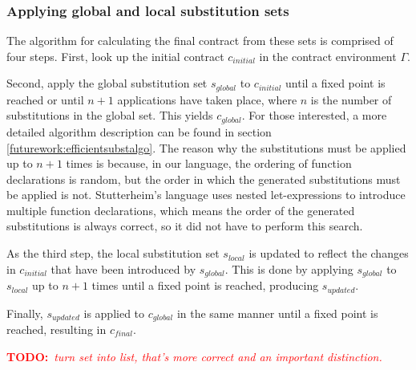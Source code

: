 \documentclass[10pt]{report}
\newcommand{\annotate}[3]{
	\begin{scriptsize}
	\textcolor{#1}{\textbf{#2}~\textit{#3}}
	\end{scriptsize}\newline}
\newcommand{\todo}[1]{\annotate{red} {TODO:} {#1}}
\begin{document}
\subsubsection{Applying global and local substitution sets}

The algorithm for calculating the final contract from these sets is comprised of four steps.
First, look up the initial contract $c_{initial}$ in the contract environment $\Gamma$.

Second, apply the global substitution set $s_{global}$ to $c_{initial}$ until a fixed point is reached or until $n+1$ applications have taken place, where $n$ is the number of substitutions in the global set. 
This yields $c_{global}$.
For those interested, a more detailed algorithm description can be found in section \ref{futurework:efficientsubstalgo}.
The reason why the substitutions must be applied up to $n+1$ times is because, in our language, the ordering of function declarations is random, but the order in which the generated substitutions must be applied is not.
Stutterheim's language uses nested let-expressions to introduce multiple function declarations, which means the order of the generated substitutions is always correct, so it did not have to perform this search.

As the third step, the local substitution set $s_{local}$ is updated to reflect the changes in $c_{initial}$ that have been introduced by $s_{global}$.
This is done by applying $s_{global}$ to $s_{local}$ up to $n+1$ times until a fixed point is reached, producing $s_{updated}$.

Finally, $s_{updated}$ is applied to $c_{global}$ in the same manner until a fixed point is reached, resulting in $c_{final}$.



\todo{turn set into list, that's more correct and an important distinction.}

%
\end{document}
